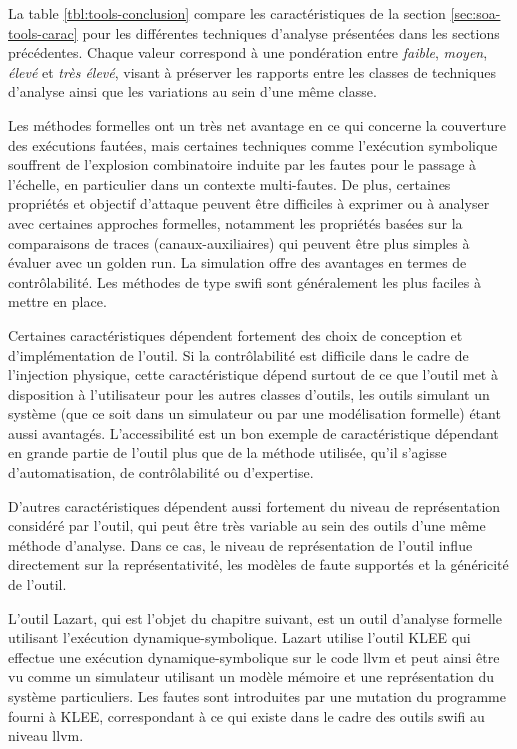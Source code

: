             La table \ref{tbl:tools-conclusion} compare les caractéristiques de la section \ref{sec:soa-tools-carac} pour les différentes techniques d'analyse présentées dans les sections précédentes.
            Chaque valeur correspond à une pondération entre \textit{faible}, \textit{moyen}, \textit{élevé} et \textit{très élevé}, visant à préserver les rapports entre les classes de techniques d'analyse ainsi que les variations au sein d'une même classe.
            
            Les méthodes formelles ont un très net avantage en ce qui concerne la couverture des exécutions fautées, mais certaines techniques comme l'exécution symbolique souffrent de l'explosion combinatoire induite par les fautes pour le passage à l'échelle, en particulier dans un contexte multi-fautes.
            De plus, certaines propriétés et objectif d'attaque peuvent être difficiles à exprimer ou à analyser avec certaines approches formelles, notamment les propriétés basées sur la comparaisons de traces (canaux-auxiliaires) qui peuvent être plus simples à évaluer avec un golden run. 
            La simulation offre des avantages en termes de contrôlabilité.
            Les méthodes de type \gls{swifi} sont généralement les plus faciles à mettre en place.
            
            Certaines caractéristiques dépendent fortement des choix de conception et d'implémentation de l'outil. Si la contrôlabilité est difficile dans le cadre de l'injection physique, cette caractéristique dépend surtout de ce que l'outil met à disposition à l'utilisateur pour les autres classes d'outils, les outils simulant un système (que ce soit dans un simulateur ou par une modélisation formelle) étant aussi avantagés. 
            L'accessibilité est un bon exemple de caractéristique dépendant en grande partie de l'outil plus que de la méthode utilisée, qu'il s'agisse d'automatisation, de contrôlabilité ou d'expertise. 
            
            D'autres caractéristiques dépendent aussi fortement du niveau de représentation considéré par l'outil, qui peut être très variable au sein des outils d'une même méthode d'analyse. 
            Dans ce cas, le niveau de représentation de l'outil influe directement sur la représentativité, les modèles de faute supportés et la généricité de l'outil.
            
            L'outil Lazart, qui est l'objet du chapitre suivant, est un outil d'analyse formelle utilisant l'exécution dynamique-symbolique.
            Lazart utilise l'outil KLEE qui effectue une exécution dynamique-symbolique sur le code \gls{llvm} et peut ainsi être vu comme un simulateur utilisant un modèle mémoire et une représentation du système particuliers.
            Les fautes sont introduites par une mutation du programme fourni à KLEE, correspondant à ce qui existe dans le cadre des outils \gls{swifi} au niveau \gls{llvm}.
            
